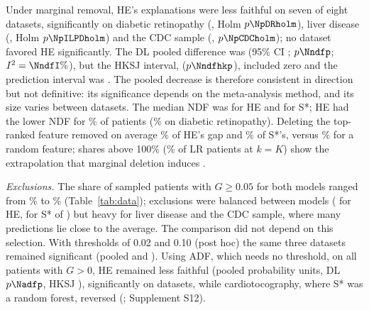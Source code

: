 Under marginal removal, HE's explanations were less faithful on seven of eight datasets, significantly on diabetic retinopathy (\NpDR, Holm $p\NpDRholm$), liver disease (\NpILPD, Holm $p\NpILPDholm$) and the CDC sample (\NpCDC, $p\NpCDCholm$); no dataset favored HE significantly. The DL pooled difference was \Nndf{} (95\% CI \Nndfci; $p\Nndfp$; $I^2=\NndfI\%$), but the HKSJ interval, \Nndfhk{} ($p\Nndfhkp$), included zero and the prediction interval was \Nndfpi. The pooled decrease is therefore consistent in direction but not definitive: its significance depends on the meta-analysis method, and its size varies between datasets. The median NDF was \Nmedhe{} for HE and \Nmeds{} for S*; HE had the lower NDF for \Nsharelower\% of patients (\NshareDR\% on diabetic retinopathy). Deleting the top-ranked feature removed on average \NtoponeHE\% of HE's gap and \NtoponeS\% of S*'s, versus \NrandoneS\% for a random feature; shares above 100\% (\NoverLR\% of LR patients at $k{=}K$) show the extrapolation that marginal deletion induces \cite{hooker_mentch}.

\emph{Exclusions.} The share of sampled patients with $G\ge0.05$ for both models ranged from \Ninclmin\% to \Ninclmax\% (Table~\ref{tab:data}); exclusions were balanced between models (\Nexclhe{} for HE, \Nexcls{} for S* of \Nnsamp) but heavy for liver disease and the CDC sample, where many predictions lie close to the average. The comparison did not depend on this selection. With thresholds of 0.02 and 0.10 (post hoc) the same three datasets remained significant (pooled \Nthrtwo{} and \Nthrten). Using ADF, which needs no threshold, on all \Nadfn{} patients with $G>0$, HE remained less faithful (pooled \Nadf{} probability units, DL $p\Nadfp$, HKSJ \Nadfhk), significantly on \Nadfneg{} datasets, while cardiotocography, where S* was a random forest, reversed (\NadfCTG; Supplement S12).

